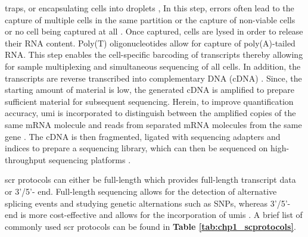 traps, \textbf{\cite{kalisky_brief_2018,treutlein_reconstructing_2014,streets_microfluidic_2014}} 
or encapsulating cells into droplets \textbf{\cite{kalisky_brief_2018,klein_droplet_2015,macosko_highly_2015}}, %
In this step, errors often lead to the capture of multiple cells in the same partition or the capture of non-viable cells or no cell being captured at all \textbf{\cite{svensson_exponential_2018}}. Once captured, cells are lysed in order to release their RNA content. Poly(T) oligonucleotides allow for capture of poly(A)-tailed RNA. This step enables the cell-specific barcoding of transcripts thereby allowing for sample multiplexing and simultaneous sequencing of all cells. In addition, the transcripts are reverse transcribed into complementary DNA (cDNA) \textbf{\cite{svensson_exponential_2018,haque_practical_2017}}. Since, the starting amount of material is low, the generated cDNA is amplified to prepare sufficient material for subsequent sequencing. Herein, to improve quantification accuracy, \gls{umi} is incorporated to distinguish between the amplified copies of the same mRNA molecule and reads from separated mRNA molecules from the same gene \textbf{\cite{haque_practical_2017}}. The cDNA is then fragmented, ligated with sequencing adapters and indices to prepare a sequencing library, which can then be sequenced on high-throughput sequencing platforms \textbf{\cite{svensson_exponential_2018,haque_practical_2017}}.\\
\par \gls{scr} protocols can either be full-length which provides full-length transcript data or 3'/5'- end. Full-length sequencing allows for the detection of alternative splicing events and studying genetic alternations such as SNPs, whereas 3'/5'- end is more cost-effective and allows for the incorporation of \glspl{umi} \textbf{\cite{baran-gale_experimental_2018}}. A brief list of commonly used \gls{scr} protocols can be found in \textbf{Table \ref{tab:chp1_scprotocols}}.


